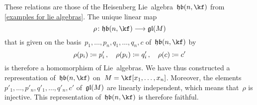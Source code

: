 \begin{examples}
\begin{enumerate}
			These relations are those of the Heisenberg Lie~algebra~$\heisenberglie(n, \kf)$ from \cref{examples for lie algebras}.
			The unique linear map
			\[
				\rho
				\colon
				\heisenberglie(n, \kf)
				\to
				\gllie(M)
			\]
			that is given on the basis~$p_1, \dotsc, p_n, q_1, \dotsc, q_n, c$ of~$\heisenberglie(n, \kf)$ by
			\[
				\rho(p_i) \coloneqq p'_i \,,
				\quad
				\rho(p_i) \coloneqq q'_i \,,
				\quad
				\rho(c) \coloneqq c'
			\]
			is therefore a homomorphism of Lie~algebras.
			We have thus constructed a representation of~$\heisenberglie(n, \kf)$ on~$M = \kf[x_1, \dotsc, x_n]$.
			Moreover, the elements~$p'_1, \dotsc, p'_n, q'_1, \dotsc, q'_n, c'$ of~$\mathfrak{gl}(M)$ are linearly independent, which means that~$\rho$ is injective.
			This representation of~$\heisenberglie(n, \kf)$ is therefore faithful.


\end{enumerate}
\end{examples}
